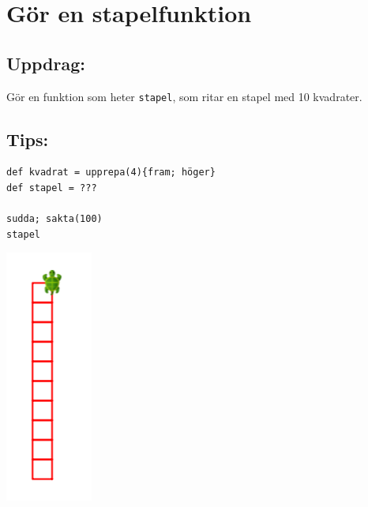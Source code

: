 \chapter{Gör en stapelfunktion}
\begin{multicols}{2}
\section*{\color{BrickRed}Uppdrag:}
Gör en funktion som heter \lstinline{stapel}, som ritar en stapel med 10 kvadrater.
\section*{\color{OliveGreen}Tips:}

\begin{lstlisting}[]
def kvadrat = upprepa(4){fram; höger}  
def stapel = ???

sudda; sakta(100)
stapel
\end{lstlisting}
        

\columnbreak

\begin{center}
\includegraphics{../img/square-column.png}
\end{center}

\end{multicols}

